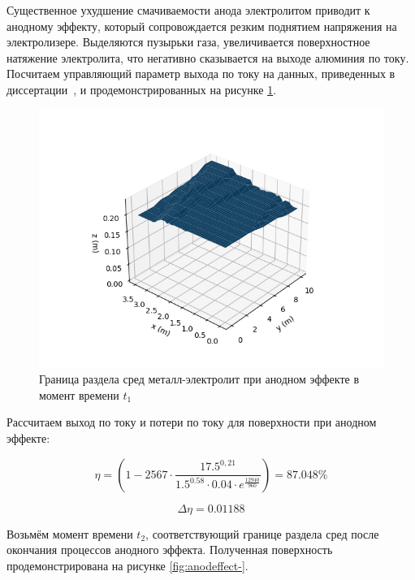 \documentclass{article}
\begin{document}
Существенное ухудшение смачиваемости анода электролитом приводит к анодному эффекту, который сопровождается резким поднятием напряжения на электролизере. Выделяются пузырьки газа, увеличивается поверхностное натяжение электролита, что негативно сказывается на выходе алюминия по току. Посчитаем управляющий параметр выхода по току на данных, приведенных в диссертации~\cite{litlink:kalmykov}, и продемонстрированных на рисунке \ref{fig:anodeffect}.

\begin{figure}[H]
\centering
\includegraphics[width=0.8\linewidth]{anodeffect.png}
\caption{Граница раздела сред металл-электролит при анодном эффекте в момент времени $t_1$ \label{fig:anodeffect}}
\end{figure}

Рассчитаем выход по току и потери по току для поверхности при анодном эффекте:

\begin{equation}
\eta=(1-2567 \cdot \frac{17.5^{0,21}}{1.5^{0.58} \cdot 0.04 \cdot e^{\frac{12940}{960}}}) = 87.048 \%
\end{equation}

\begin{equation}
\Delta \eta = 0.01188
\end{equation}


Возьмём момент времени $t_2$, соответствующий границе раздела сред после окончания процессов анодного эффекта. Полученная поверхность продемонстрирована на рисунке \ref{fig:anodeffect-}.
\end{document}
